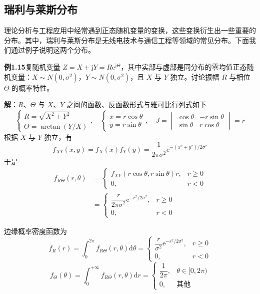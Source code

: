 \documentclass[11pt,openany,UTF8]{ctexbook}
\newcommand{\dif}{\mathrm{d}}                      %
\newcommand{\eu}{\mathrm{e}}                       %
\newcommand{\ju}{\mathrm{j}}                       %
\begin{document}
\subsection{瑞利与莱斯分布}

理论分析与工程应用中经常遇到正态随机变量的变换\nobreak，这些变换衍生出一些重要的分布\nobreak。其中\nobreak，瑞利与莱斯分布是无线电技术与通信工程等领域的常见分布\nobreak。下面我们通过例子说明这两个分布\nobreak。

\begin{examplebox}
\textbf{例1.15}\quad 复随机变量 $Z=X+\ju Y=R\eu^{\ju\Theta}$\nobreak，其中实部与虚部是同分布的零均值正态随机变量\nobreak：$X\sim N(0,\sigma^2)$\nobreak，$Y\sim N(0,\sigma^2)$\nobreak，且 $X$ 与 $Y$ 独立\nobreak。讨论振幅 $R$ 与相位 $\Theta$ 的概率特性\nobreak。

\textbf{解}\nobreak：$R$\nobreak、$\Theta$ 与 $X$\nobreak、$Y$ 之间的函数\nobreak、反函数形式与雅可比行列式如下
\[
\begin{cases}
R=\sqrt{X^2+Y^2}\\
\Theta=\arctan(Y/X)
\end{cases},\quad
\begin{cases}
x=r\cos\theta\\
y=r\sin\theta
\end{cases},\quad
J=\begin{vmatrix}
\cos\theta & -r\sin\theta\\
\sin\theta & r\cos\theta
\end{vmatrix}=r
\]
根据 $X$ 与 $Y$ 独立\nobreak，有
\[
f_{XY}(x,y)=f_X(x)f_Y(y)=\frac{1}{2\pi\sigma^2}\eu^{-(x^2+y^2)/2\sigma^2}
\]
于是
\begin{equation}
\begin{aligned}
f_{R\Theta}(r,\theta)&=\begin{cases}
f_{XY}(r\cos\theta,r\sin\theta)r, & r\geqslant 0\\
0, & r<0
\end{cases}\\
&=\begin{cases}
\dfrac{r}{2\pi\sigma^2}\eu^{-r^2/2\sigma^2}, & r\geqslant 0\\[4pt]
0, & r<0
\end{cases}
\end{aligned}
\label{eq:1.40}
\end{equation}

边缘概率密度函数为
\begin{equation}
f_R(r)=\int_0^{2\pi}f_{R\Theta}(r,\theta)\dif\theta=\begin{cases}
\dfrac{r}{\sigma^2}\eu^{-r^2/2\sigma^2}, & r\geqslant 0\\[4pt]
0, & r<0
\end{cases}
\label{eq:1.41}
\end{equation}
\begin{equation}
f_\Theta(\theta)=\int_0^{+\infty}f_{R\Theta}(r,\theta)\dif r=\begin{cases}
\dfrac{1}{2\pi}, & \theta\in[0,2\pi)\\[4pt]
0, & \text{其他}
\end{cases}
\label{eq:1.42}
\end{equation}


\end{examplebox}
\end{document}
